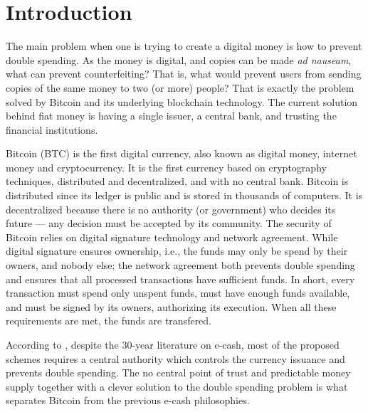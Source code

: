 

\chapter{Introduction}

The main problem when one is trying to create a digital money is how to prevent double spending. As the money is digital, and copies can be made \textit{ad nauseam}, what can prevent counterfeiting? That is, what would prevent users from sending copies of the same money to two (or more) people? That is exactly the problem solved by Bitcoin and its underlying blockchain technology. The current solution behind fiat money is having a single issuer, a central bank, and trusting the financial institutions.

Bitcoin (BTC) is the first digital currency, also known as digital money, internet money and cryptocurrency. It is the first currency based on cryptography techniques, distributed and decentralized, and with no central bank. Bitcoin is distributed since its ledger is public and is stored in thousands of computers. It is decentralized because there is no authority (or government) who decides its future --- any decision must be accepted by its community. The security of Bitcoin relies on digital signature technology and network agreement. While digital signature ensures ownership, i.e., the funds may only be spend by their owners, and nobody else; the network agreement both prevents double spending and ensures that all processed transactions have sufficient funds. In short, every transaction must spend only unspent funds, must have enough funds available, and must be signed by its owners, authorizing its execution. When all these requirements are met, the funds are transfered.

According to \citet{barber2012bitter}, despite the 30-year literature on e-cash, most of the proposed schemes requires a central authority which controls the currency issuance and prevents double spending. The no central point of trust and predictable money supply together with a clever solution to the double spending problem is what separates Bitcoin from the previous e-cash philosophies. %


